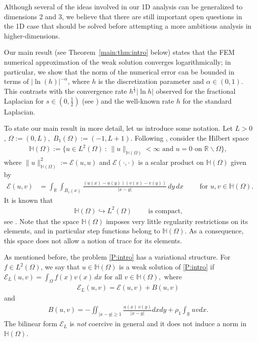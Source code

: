 \documentclass[11 pt]{article}
\numberwithin{equation}{section}
\def\R{\mathbb{R}}
\def\mH{\mathbb{H}}
\def\cE{\mathcal{E}}
\begin{document}
Although several of the ideas involved in our 1D analysis can be generalized to dimensions 2 and 3, we believe that there are still important open questions in the 1D case that should be solved before attempting a more ambitious analysis in higher-dimensions.

Our main result (see Theorem~\ref{main:thm:intro} below) states that the FEM numerical approximation of the weak solution converges logarithmically; in particular, we show that the norm of the numerical error can be bounded in terms of $|\ln(h)|^{-\alpha}$, where $h$ is the discretization parameter and $\alpha\in(0,1)$.   This contrasts with the convergence rate $h^\frac{1}{2}|\ln h|$ observed for the fractional Laplacian for $s\in(0,\frac{1}{2})$ (see \cite[Theorem 3.31]{Bor17}) and the well-known rate $h$ for the standard Laplacian.

To state our main result in more detail, let us introduce some notation. Let $L>0$, $\Omega:=(0,L),$ $B_1(\Omega):=(-1,L+1)$. Following \cite{CW19}, consider the Hilbert space
\begin{align*}
\mH(\Omega):=\{u\in L^2(\Omega)\::\: \|u\|_{\mathbb H(\Omega)}<\infty \text{ and }u=0\text{ on }\R\backslash \Omega\},
\end{align*}
where $\|u\|^2_{\mathbb H(\Omega)}:={\mathcal E}(u,u)$ and ${\mathcal E}(\cdot,\cdot)$ is a scalar product on $\mathbb H(\Omega)$ given by
\begin{align*}
    {\mathcal E}(u,v)&=\int_{\R}\int_{B_1(x)}\frac{(u(x)-u(y))(v(x)-v(y))}{|x-y|}\, dy\, dx \qquad \text{ for }u,v\in \mH(\Omega).
\end{align*}
It is known that
\begin{align}\label{c:em}
\mathbb H(\Omega)\hookrightarrow L^2(\Omega)\qquad \text{ is compact,}
\end{align}
see \cite[Theorem 2.1]{CdP18}. Note that the space $\mH(\Omega)$ imposes very little regularity restrictions on its elements, and in particular step functions belong to $\mH(\Omega)$. As a consequence, this space does not allow a notion of trace for its elements.

As mentioned before, the problem \eqref{P:intro} has a variational structure. For $f\in L^2(\Omega)$, we say that $u\in \mH(\Omega)$ is a weak solution of \eqref{P:intro} if $    \cE_{L}(u,v)=\int_{\Omega} f(x) v(x)\, dx$ for all $v\in  \mH(\Omega),$ where
\begin{align}\label{cEL:def}
\cE_L(u,v)=\cE(u,v)+B(u,v) 
\end{align}
and
\begin{align}\label{eq:bilinear_B}
    B(u,v)=-\iint_{|x-y|\geq 1}\frac{u(x)\,v(y)}{|x-y|}dx dy+\rho_1\int_{\R}u v dx.
\end{align}
 The bilinear form $\cE_L$ is \emph{not} coercive in general and it does not induce a norm in $\mH(\Omega)$.
\end{document}
